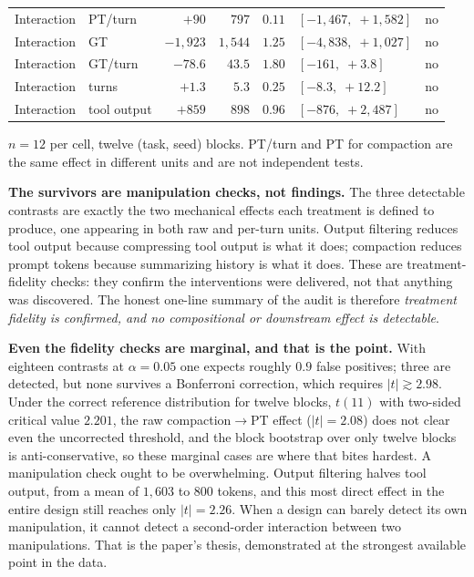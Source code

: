 \documentclass{article}
\begin{document}
\begin{table}[!htbp]
\begin{tabularx}{\textwidth}{@{}llrrrXc@{}}
Interaction & PT/turn & $+90$ & $797$ & $0.11$ & $[-1{,}467,\;+1{,}582]$ & no \\
Interaction & GT & $-1{,}923$ & $1{,}544$ & $1.25$ & $[-4{,}838,\;+1{,}027]$ & no \\
Interaction & GT/turn & $-78.6$ & $43.5$ & $1.80$ & $[-161,\;+3.8]$ & no \\
Interaction & turns & $+1.3$ & $5.3$ & $0.25$ & $[-8.3,\;+12.2]$ & no \\
Interaction & tool output & $+859$ & $898$ & $0.96$ & $[-876,\;+2{,}487]$ & no \\
\bottomrule
\end{tabularx}
{\footnotesize\raggedright $n=12$ per cell, twelve (task, seed) blocks. PT/turn and PT for compaction are the same effect in different units and are not independent tests.\par}
\end{table}

\textbf{The survivors are manipulation checks, not findings.} The three detectable contrasts are exactly the two mechanical effects each treatment is defined to produce, one appearing in both raw and per-turn units. Output filtering reduces tool output because compressing tool output is what it does; compaction reduces prompt tokens because summarizing history is what it does. These are treatment-fidelity checks: they confirm the interventions were delivered, not that anything was discovered. The honest one-line summary of the audit is therefore \emph{treatment fidelity is confirmed, and no compositional or downstream effect is detectable}.

\textbf{Even the fidelity checks are marginal, and that is the point.} With eighteen contrasts at $\alpha=0.05$ one expects roughly $0.9$ false positives; three are detected, but none survives a Bonferroni correction, which requires $|t|\gtrsim2.98$. Under the correct reference distribution for twelve blocks, $t(11)$ with two-sided critical value $2.201$, the raw compaction$\rightarrow$PT effect ($|t|=2.08$) does not clear even the uncorrected threshold, and the block bootstrap over only twelve blocks is anti-conservative, so these marginal cases are where that bites hardest. A manipulation check ought to be overwhelming. Output filtering halves tool output, from a mean of $1{,}603$ to $800$ tokens, and this most direct effect in the entire design still reaches only $|t|=2.26$. When a design can barely detect its own manipulation, it cannot detect a second-order interaction between two manipulations. That is the paper's thesis, demonstrated at the strongest available point in the data.
\end{document}
